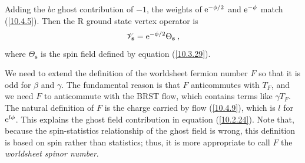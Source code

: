 	Adding the $bc$ ghost contribution of $-1$, the weights of $\mathrm{e}^{-\phi/2}$ and $\mathrm{e}^{-\phi}$ match (\ref{10.4.5}). Then the R ground state vertex operator is
	\begin{equation}
		\mathscr{V}_{\mathbf{s}}=\mathrm{e}^{-\phi/2} \Theta_{\mathbf{s}} \:, \label{10.4.25}
	\end{equation}
	where $\Theta_{\mathbf{s}}$ is the spin field defined by equation (\ref{10.3.29}).
	
	We need to extend the definition of the worldsheet fermion number $F$ so that it is odd for $\beta$ and $\gamma$. The fundamental reason is that $F$ anticommutes with $T_{F}$, and we need $F$ to anticommute with the BRST flow, which contains terms like $\gamma T_{F}$. The natural definition of $F$ is the charge carried by flow (\ref{10.4.9}), which is $l$ for $\mathrm{e}^{l\phi}$. This explains the ghost field contribution in equation (\ref{10.2.24}). Note that, because the spin-statistics relationship of the ghost field is wrong, this definition is based on spin rather than statistics; thus, it is more appropriate to call $F$ the \emph{worldsheet spinor number}.
	
